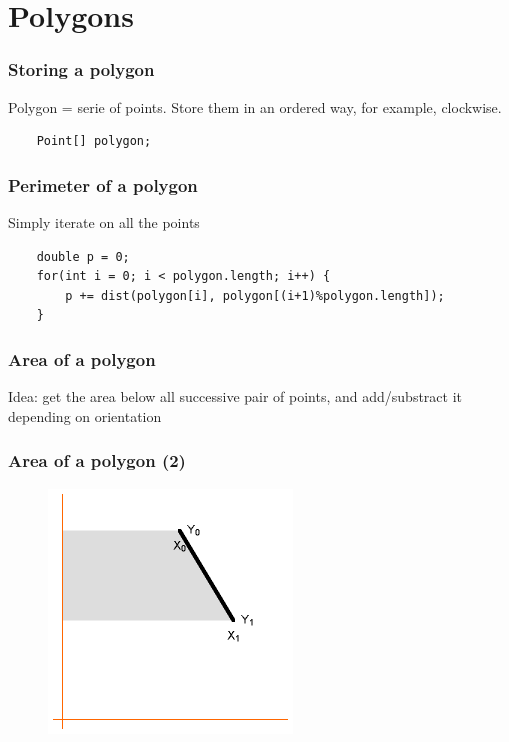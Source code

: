 \documentclass[pdf]{beamer}
\begin{document}
\section{Polygons}
\begin{frame}[fragile]
	\frametitle{Storing a polygon}
	Polygon = serie of points. Store them in an ordered way, for example, clockwise.
	
	\begin{lstlisting}
	Point[] polygon;
	\end{lstlisting}
\end{frame}

\begin{frame}[fragile]
	\frametitle{Perimeter of a polygon}
	Simply iterate on all the points
	\begin{lstlisting}
	double p = 0;
	for(int i = 0; i < polygon.length; i++) {
		p += dist(polygon[i], polygon[(i+1)%polygon.length]);
	}
	\end{lstlisting}
\end{frame}

\begin{frame}
	\frametitle{Area of a polygon}
	\pause Idea: get the area below all successive pair of points, and add/substract it depending on orientation
\end{frame}

\begin{frame}
	\frametitle{Area of a polygon (2)}
	\begin{figure}
		\centering
		\includegraphics[width=0.7\linewidth]{area1}
	\end{figure}
\end{frame}
\end{document}
